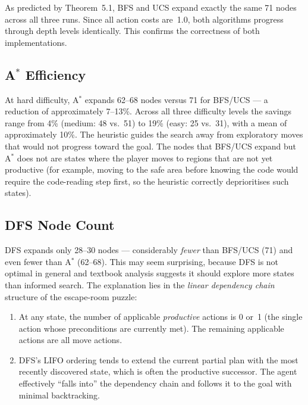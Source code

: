 \documentclass[12pt, a4paper]{report}
\begin{document}
As predicted by Theorem~5.1, BFS and UCS expand exactly the same 71 nodes
across all three runs.  Since all action costs are~1.0, both algorithms
progress through depth levels identically.  This confirms the correctness of
both implementations.

\subsection{A$^{\ast}$ Efficiency}

At hard difficulty, A$^{\ast}$ expands 62--68 nodes versus 71 for BFS/UCS --- a reduction of
approximately 7--13\%.  Across all three difficulty levels the savings range from 4\% (medium: 48 vs.\ 51) to 19\% (easy: 25 vs.\ 31), with a mean of approximately 10\%.  The heuristic guides the search away from exploratory moves
that would not progress toward the goal.  The nodes that BFS/UCS expand but
A$^{\ast}$ does not are states where the player moves to regions that are not
yet productive (for example, moving to the safe area before knowing the code
would require the code-reading step first, so the heuristic correctly deprioritises
such states).

\subsection{DFS Node Count}
\label{sec:dfsexplain}

DFS expands only 28--30 nodes --- considerably \emph{fewer} than BFS/UCS (71) and even
fewer than A$^{\ast}$ (62--68).  This may seem surprising, because DFS is not
optimal in general and textbook analysis suggests it should explore more states
than informed search.  The explanation lies in the \emph{linear dependency chain}
structure of the escape-room puzzle:

\begin{enumerate}[leftmargin=1.5em]
  \item At any state, the number of applicable \emph{productive} actions is
        0 or~1 (the single action whose preconditions are currently met).
        The remaining applicable actions are all move actions.
  \item DFS's LIFO ordering tends to extend the current partial plan with
        the most recently discovered state, which is often the productive successor.
        The agent effectively ``falls into'' the dependency chain and follows
        it to the goal with minimal backtracking.
\end{enumerate}
\end{document}
